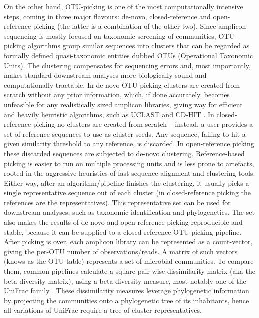 \documentclass[10pt,letterpaper]{article}
\begin{document}
On the other hand, OTU-picking is one of the most computationally intensive steps, coming in three major flavours: de-novo, closed-reference and open-reference picking (the latter is a combination of the other two). 
Since amplicon sequencing is mostly focused on taxonomic screening of communities, OTU-picking algorithms group similar sequences into clusters that can be regarded as formally defined quasi-taxonomic entities dubbed OTUs (Operational Taxonomic Units). 
The clustering compensates for sequencing errors and, most importantly, makes standard downstream analyses more biologically sound and computationally tractable. 
In de-novo OTU-picking clusters are created from scratch without any prior information, which, if done accurately, becomes unfeasible for any realistically sized amplicon libraries, giving way for efficient and heavily heuristic algorithms, such as UCLAST \cite{Edgar2010} and CD-HIT \cite{Fu2012}. 
In closed-reference picking no clusters are created from scratch – instead, a user provides a set of reference sequences to use as cluster seeds. 
Any sequence, failing to hit a given similarity threshold to any reference, is discarded. 
In open-reference picking these discarded sequences are subjected to de-novo clustering. Reference-based picking is easier to run on multiple processing units and is less prone to artefacts, rooted in the aggressive heuristics of fast sequence alignment and clustering tools. 
Either way, after an algorithm/pipeline finishes the clustering, it usually picks a single representative sequence out of each cluster (in closed-reference picking the references are the representatives). 
This representative set can be used for downstream analyses, such as taxonomic identification and phylogenetics. 
The set also makes the results of de-novo and open-reference picking reproducible and stable, because it can be supplied to a closed-reference OTU-picking pipeline.
After picking is over, each amplicon library can be represented as a count-vector, giving the per-OTU number of observations/reads. 
A matrix of such vectors (knows as the OTU-table) represents a set of microbial communities. 
To compare them, common pipelines calculate a square pair-wise dissimilarity matrix (aka the beta-diversity matrix), using a beta-diversity measure, most notably one of the UniFrac family \cite{lozupone2011unifrac}. 
These dissimilarity measures leverage phylogenetic information by projecting the communities onto a phylogenetic tree of its inhabitants, hence all variations of UniFrac require a tree of cluster representatives.
\end{document}
